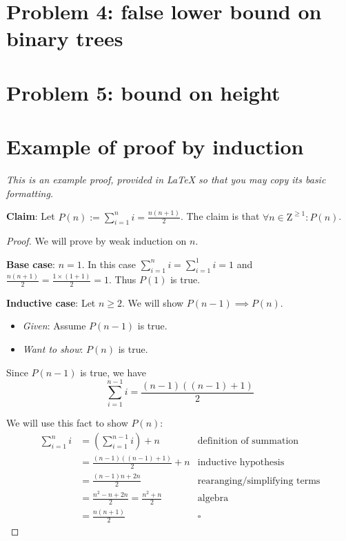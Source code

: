 \documentclass[titlepage]{article}
\begin{document}
\section{Problem 4: false lower bound on binary trees}

\section{Problem 5: bound on height}

\section{Example of proof by induction}

\emph{This is an example proof, provided in LaTeX so that you may copy its basic formatting.}

\textbf{Claim}: Let $P(n) := \sum_{i=1}^n i = \frac{n(n+1)}{2}$.  The claim is that $\forall n \in \mathrm{Z}^{\geq 1}: P(n)$.

\begin{proof}
We will prove by weak induction on $n$.

\textbf{Base case}: $n=1$.  In this case $\sum_{i=1}^n i = \sum_{i=1}^1 i = 1$ and $\frac{n(n+1)}{2} = \frac{1 \times (1+1)}{2} = 1$.  Thus $P(1)$ is true.


\textbf{Inductive case}: Let $n \geq 2$.  We will show $P(n-1) \implies P(n)$.
\begin{itemize}
\item \emph{Given}: Assume $P(n-1)$ is true.
\item \emph{Want to show}: $P(n)$ is true.
\end{itemize}
Since $P(n-1)$ is true, we have
$$\sum_{i=1}^{n-1} i = \frac{(n-1)((n-1)+1)}{2}$$

We will use this fact to show $P(n)$:
\begin{align*}
\sum_{i=1}^{n} i &= \left( \sum_{i=1}^{n-1} i \right) + n & \text{definition of summation} \\
&= \frac{(n-1)((n-1)+1)}{2} + n & \text{inductive hypothesis} \\
&= \frac{(n-1)n + 2n}{2} & \text{rearanging/simplifying terms} \\
&= \frac{n^2 - n + 2n}{2} = \frac{n^2 + n}{2}  & \text{algebra} \\
&= \frac{n(n + 1)}{2}  & \square
\end{align*}
\end{proof}
\end{document}
